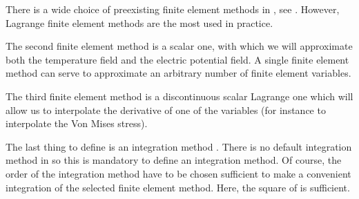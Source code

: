\documentclass[a4paper,11pt,english]{sphinxmanual}
\begin{document}
There is a wide choice of pre\sphinxhyphen{}existing finite element methods in , see . However, Lagrange finite element methods are the most used in practice.

The second finite element method is a scalar one,  with which we will approximate both the temperature field and the electric potential field. A single finite element method can serve to approximate an arbitrary number of finite element variables.

The third finite element method is a discontinuous scalar Lagrange one which will allow us to interpolate the derivative of one of the variables (for instance to interpolate the Von Mises stress).

The last thing to define is an integration method . There is no default integration method in  so this is mandatory to define an integration method. Of course, the order of the integration method have to be chosen sufficient to make a convenient integration of the selected finite element method. Here, the square of  is sufficient.
\end{document}
